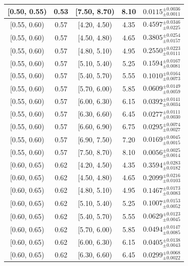 \begin{longtable}{|c|c|c|c|c|}
\hline
[0.50, 0.55) & 0.53 & [7.50, 8.70) & 8.10 & $0.0115^{ \pm 0.0036 }_{ \pm 0.0011 }$ \\ 
\hline
[0.55, 0.60) & 0.57 & [4.20, 4.50) & 4.35 & $0.4597^{ \pm 0.0346 }_{ \pm 0.0225 }$ \\ 
\hline
[0.55, 0.60) & 0.57 & [4.50, 4.80) & 4.65 & $0.3805^{ \pm 0.0254 }_{ \pm 0.0157 }$ \\ 
\hline
[0.55, 0.60) & 0.57 & [4.80, 5.10) & 4.95 & $0.2550^{ \pm 0.0223 }_{ \pm 0.0111 }$ \\ 
\hline
[0.55, 0.60) & 0.57 & [5.10, 5.40) & 5.25 & $0.1594^{ \pm 0.0167 }_{ \pm 0.0081 }$ \\ 
\hline
[0.55, 0.60) & 0.57 & [5.40, 5.70) & 5.55 & $0.1010^{ \pm 0.0164 }_{ \pm 0.0073 }$ \\ 
\hline
[0.55, 0.60) & 0.57 & [5.70, 6.00) & 5.85 & $0.0609^{ \pm 0.0149 }_{ \pm 0.0059 }$ \\ 
\hline
[0.55, 0.60) & 0.57 & [6.00, 6.30) & 6.15 & $0.0392^{ \pm 0.0141 }_{ \pm 0.0034 }$ \\ 
\hline
[0.55, 0.60) & 0.57 & [6.30, 6.60) & 6.45 & $0.0277^{ \pm 0.0111 }_{ \pm 0.0030 }$ \\ 
\hline
[0.55, 0.60) & 0.57 & [6.60, 6.90) & 6.75 & $0.0295^{ \pm 0.0074 }_{ \pm 0.0027 }$ \\ 
\hline
[0.55, 0.60) & 0.57 & [6.90, 7.50) & 7.20 & $0.0169^{ \pm 0.0045 }_{ \pm 0.0015 }$ \\ 
\hline
[0.55, 0.60) & 0.57 & [7.50, 8.70) & 8.10 & $0.0056^{ \pm 0.0025 }_{ \pm 0.0014 }$ \\ 
\hline
[0.60, 0.65) & 0.62 & [4.20, 4.50) & 4.35 & $0.3594^{ \pm 0.0283 }_{ \pm 0.0182 }$ \\ 
\hline
[0.60, 0.65) & 0.62 & [4.50, 4.80) & 4.65 & $0.2099^{ \pm 0.0216 }_{ \pm 0.0103 }$ \\ 
\hline
[0.60, 0.65) & 0.62 & [4.80, 5.10) & 4.95 & $0.1467^{ \pm 0.0173 }_{ \pm 0.0083 }$ \\ 
\hline
[0.60, 0.65) & 0.62 & [5.10, 5.40) & 5.25 & $0.1007^{ \pm 0.0153 }_{ \pm 0.0052 }$ \\ 
\hline
[0.60, 0.65) & 0.62 & [5.40, 5.70) & 5.55 & $0.0629^{ \pm 0.0123 }_{ \pm 0.0045 }$ \\ 
\hline
[0.60, 0.65) & 0.62 & [5.70, 6.00) & 5.85 & $0.0494^{ \pm 0.0147 }_{ \pm 0.0085 }$ \\ 
\hline
[0.60, 0.65) & 0.62 & [6.00, 6.30) & 6.15 & $0.0405^{ \pm 0.0138 }_{ \pm 0.0043 }$ \\ 
\hline
[0.60, 0.65) & 0.62 & [6.30, 6.60) & 6.45 & $0.0299^{ \pm 0.0068 }_{ \pm 0.0022 }$ \\ 

\end{longtable}
